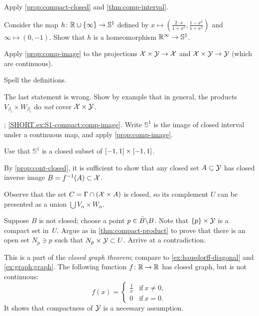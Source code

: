 Apply \ref{prop:compact-closed} and \ref{thm:comp-interval}.

Consider the map $h\colon\mathbb{R}\cup\{\infty\}\to \mathbb{S}^1$ defined by $x\mapsto (\tfrac{2\cdot x}{1+x^2},\tfrac{1-x^2}{1+x^2})$ and $\infty\mapsto (0,-1)$.
Show that $h$ is a homeomorphism $\mathbb{R}^\infty\to \mathbb{S}^1$.

Apply \ref{prop:comp-image} to the projections $\mathcal{X}\times\mathcal{Y}\to\mathcal{X}$ and $\mathcal{X}\times\mathcal{Y}\to\mathcal{Y}$ (which are continuous).

 Spell the definitions.

The last statement is wrong.
Show by example that in general, the products $V_{\beta_i}\times W_{\beta_i}$ do \textit{not} cover $\mathcal{X}\times\mathcal{Y}$.

\parbf{\ref{ex:S1-compact}};
\ref{SHORT.ex:S1-compact:comp-image}.
Write $\mathbb{S}^1$ is the image of closed interval under a continuous map, and apply \ref{prop:comp-image}.

Use that $\mathbb{S}^1$ is a closed subset of $[-1,1]\z\times[-1,1]$.

By \ref{prop:cont-closed}, it is sufficient to show that any closed set $A\subset\mathcal{Y}$ has closed inverse image $B=f^{-1}(A)\subset\mathcal{X}$.

Observe that the set $C=\Gamma\cap (\mathcal{X}\times A)$ is closed,
so its complement $U$ can be presented as a union $\bigcup V_\alpha\times W_\alpha$.

Suppose $B$ is not closed; choose a point $p\z\in \bar B\backslash B$.
Note that $\{p\}\times \mathcal{Y}$ is a compact set in~$U$.
Argue as in \ref{thm:compact-product} to prove that there is an open set $N_p\ni p$ such that $N_p\times \mathcal{Y}\subset U$.
Arrive at a contradiction.

This is a part of the \emph{closed graph theorem}; compare to \ref{ex:hausdorff-diagonal} and \ref{ex:graph:graph}.
The following function $f\colon\mathbb{R}\to\mathbb{R}$ has closed graph, but is not continuous:
\[f(x)=
\begin{cases}
\tfrac1x&\text{if}\ x\ne 0,
\\
0&\text{if}\ x= 0.
\end{cases}
\]
It shows that compactness of $\mathcal{Y}$ is a necessary assumption.

